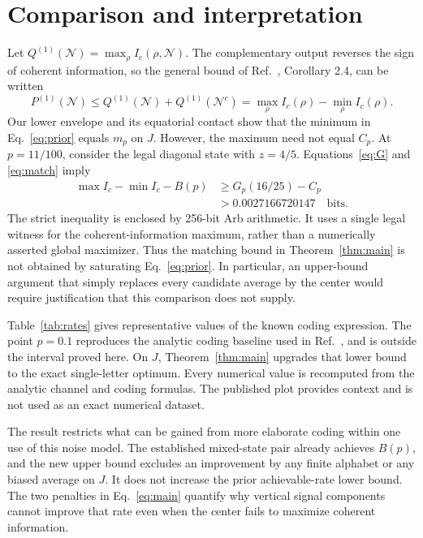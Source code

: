 \documentclass[aps,pra,reprint,amsmath,amssymb,longbibliography,nofootinbib]{revtex4-2}
\newcommand{\cN}{\mathcal N}
\begin{document}
\section{Comparison and interpretation}\label{sec:comparison}
Let $Q^{(1)}(\cN)=\max_\rho I_c(\rho,\cN)$. The complementary output reverses the sign of coherent information, so the general bound of Ref.~\cite{HL2022}, Corollary 2.4, can be written
\begin{equation}
 P^{(1)}(\cN)\le Q^{(1)}(\cN)+Q^{(1)}(\cN^c)
                  =\max_\rho I_c(\rho)-\min_\rho I_c(\rho).
 \label{eq:prior}
\end{equation}
Our lower envelope and its equatorial contact show that the minimum in Eq.~\eqref{eq:prior} equals $m_p$ on $J$. However, the maximum need not equal $C_p$. At $p=11/100$, consider the legal diagonal state with $z=4/5$. Equations~\eqref{eq:G} and \eqref{eq:match} imply
\begin{align}
 \max I_c-\min I_c-B(p)
 &\ge G_p(16/25)-C_p\nonumber\\
 &>0.0027166720147\quad\text{bits}.
 \label{eq:slack}
\end{align}
The strict inequality is enclosed by 256-bit Arb arithmetic. It uses a single legal witness for the coherent-information maximum, rather than a numerically asserted global maximizer. Thus the matching bound in Theorem~\ref{thm:main} is not obtained by saturating Eq.~\eqref{eq:prior}. In particular, an upper-bound argument that simply replaces every candidate average by the center would require justification that this comparison does not supply.



Table~\ref{tab:rates} gives representative values of the known coding expression. The point $p=0.1$ reproduces the analytic coding baseline used in Ref.~\cite{LLS2018}, and is outside the interval proved here. On $J$, Theorem~\ref{thm:main} upgrades that lower bound to the exact single-letter optimum. Every numerical value is recomputed from the analytic channel and coding formulas. The published plot provides context and is not used as an exact numerical dataset.

The result restricts what can be gained from more elaborate coding within one use of this noise model. The established mixed-state pair already achieves $B(p)$, and the new upper bound excludes an improvement by any finite alphabet or any biased average on $J$. It does not increase the prior achievable-rate lower bound. The two penalties in Eq.~\eqref{eq:main} quantify why vertical signal components cannot improve that rate even when the center fails to maximize coherent information.
\end{document}
